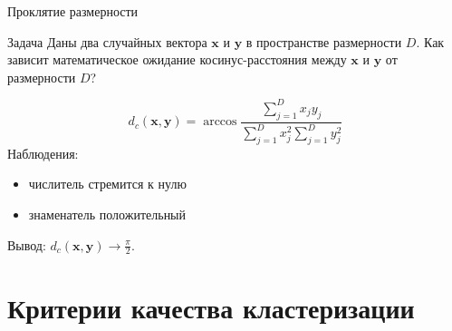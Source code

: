 \documentclass[10pt,a4paper]{beamer}
\begin{document}

\begin{frame}{Проклятие размерности}

\begin{block}{Задача}
Даны два случайных вектора $\mathbf{x}$ и $\mathbf{y}$ в пространстве размерности $D$. Как зависит математическое ожидание косинус-расстояния между $\mathbf{x}$ и $\mathbf{y}$ от размерности $D$?
\end{block}

\[
d_c(\mathbf{x}, \mathbf{y}) = \arccos \frac{\sum_{j=1}^D x_j y_j}{\sum_{j=1}^D x_j^2 \sum_{j=1}^D y_j^2}
\]
Наблюдения:
\begin{itemize}
\item числитель стремится к нулю
\item знаменатель положительный
\end{itemize}
Вывод: $d_c(\mathbf{x}, \mathbf{y}) \rightarrow \frac \pi 2$.

\end{frame}


\section{Критерии качества кластеризации}

\end{document}
